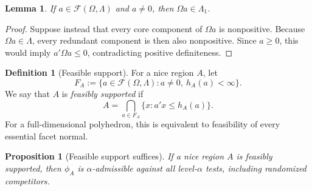 \documentclass[12pt]{article}
\newtheorem{proposition}[theorem]{Proposition}
\newtheorem{lemma}[theorem]{Lemma}
\theoremstyle{definition}
\newtheorem{definition}[theorem]{Definition}
\theoremstyle{remark}
\newcommand{\cF}{\mathcal F}
\newcommand{\1}{\mathbf 1}
\begin{document}
\begin{lemma}\label{lem:feasible-alternative}
If $a\in\cF(\Omega,\Lambda)$ and $a\ne0$, then
$\Omega a\in\Lambda_1$.
\end{lemma}

\begin{proof}
Suppose instead that every core component of $\Omega a$ is nonpositive.
Because $\Omega a\in\Lambda$, every redundant component is then also
nonpositive.  Since $a\ge0$, this would imply
$a'\Omega a\le0$, contradicting positive definiteness.
\end{proof}

\begin{definition}[Feasible support]\label{def:feasible-support}
For a nice region $A$, let
\[
F_A
:=
\{a\in\cF(\Omega,\Lambda):a\ne0,\ h_A(a)<\infty\}.
\]
We say that $A$ is \emph{feasibly supported} if
\begin{equation}\label{eq:feasible-support}
A
=
\bigcap_{a\in F_A}\{x:a'x\le h_A(a)\}.
\end{equation}
For a full-dimensional polyhedron, this is equivalent to feasibility of
every essential facet normal.
\end{definition}

\begin{proposition}[Feasible support suffices]\label{prop:feasible-support}
If a nice region $A$ is feasibly supported, then $\phi_A$ is
$\alpha$-admissible against all level-$\alpha$ tests, including randomized
competitors.
\end{proposition}
\end{document}

